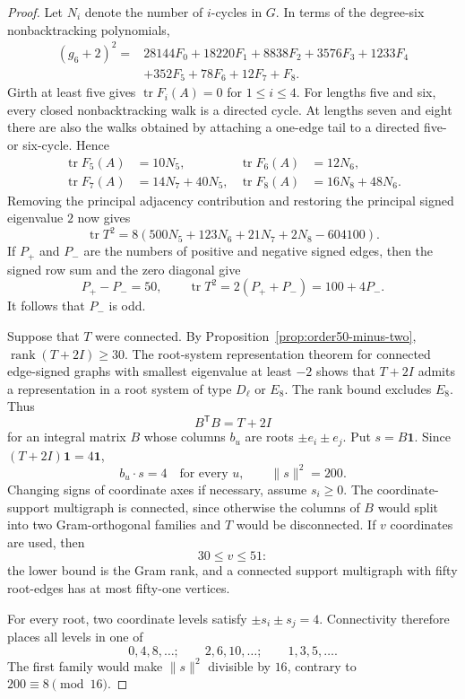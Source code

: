\documentclass[a4paper,10pt,reqno]{amsart}
\theoremstyle{plain}
\theoremstyle{definition}
\theoremstyle{remark}
\newcommand{\one}{\mathbf 1}
\newcommand{\tr}{\operatorname{tr}}
\begin{document}
\begin{proof}
Let \(N_i\) denote the number of \(i\)-cycles in \(G\).  In terms of the degree-six
nonbacktracking polynomials,
\[
\begin{aligned}
(g_6+2)^2={}&28144F_0+18220F_1+8838F_2+3576F_3+1233F_4\\
&+352F_5+78F_6+12F_7+F_8.
\end{aligned}
\]
Girth at least five gives \(\tr F_i(A)=0\) for \(1\le i\le4\).  For
lengths five and six, every closed nonbacktracking walk is a directed cycle.
At lengths seven and eight there are also the walks obtained by attaching a
one-edge tail to a directed five- or six-cycle.  Hence
\[
\begin{aligned}
\tr F_5(A)&=10N_5,&
\tr F_6(A)&=12N_6,\\
\tr F_7(A)&=14N_7+40N_5,&
\tr F_8(A)&=16N_8+48N_6.
\end{aligned}
\]
Removing the principal adjacency contribution and restoring the principal
signed eigenvalue \(2\) now gives
\[
\tr T^2
=8(500N_5+123N_6+21N_7+2N_8-604100).
\]
If \(P_+\) and \(P_-\) are the numbers of positive and negative signed edges,
then the signed row sum and the zero diagonal give
\[
P_+-P_-=50,\qquad
\tr T^2=2(P_++P_-)=100+4P_-.
\]
It follows that \(P_-\) is odd.

Suppose that \(T\) were connected.  By
Proposition~\ref{prop:order50-minus-two},
\(\operatorname{rank}(T+2I)\ge30\).  The root-system representation theorem
for connected edge-signed graphs with smallest eigenvalue at least \(-2\)
\cite[Theorem~2]{GreavesEtAl2015} shows that \(T+2I\) admits a representation
in a root system of type \(D_\ell\) or \(E_8\).  The rank bound excludes
\(E_8\).  Thus
\[
B^{\mathsf T}B=T+2I
\]
for an integral matrix \(B\) whose columns \(b_u\) are roots
\(\pm e_i\pm e_j\).  Put \(s=B\one\).  Since
\((T+2I)\one=4\one\),
\[
b_u\mathbin{\cdot}s=4\quad\text{for every }u,
\qquad
\lVert s\rVert^2=200.
\]
Changing signs of coordinate axes if necessary, assume \(s_i\ge0\).
The coordinate-support multigraph is connected, since otherwise the columns of \(B\)
would split into two Gram-orthogonal families and \(T\) would be disconnected.
If \(v\) coordinates are used, then
\[
30\le v\le51:
\]
the lower bound is the Gram rank, and a connected support multigraph with
fifty root-edges has at most fifty-one vertices.

For every root, two coordinate levels satisfy
\(\pm s_i\pm s_j=4\).  Connectivity therefore places all levels in one of
\[
0,4,8,\ldots;\qquad
2,6,10,\ldots;\qquad
1,3,5,\ldots.
\]
The first family would make \(\lVert s\rVert^2\) divisible by \(16\), contrary
to \(200\equiv8\pmod {16}\).


\end{proof}
\end{document}
